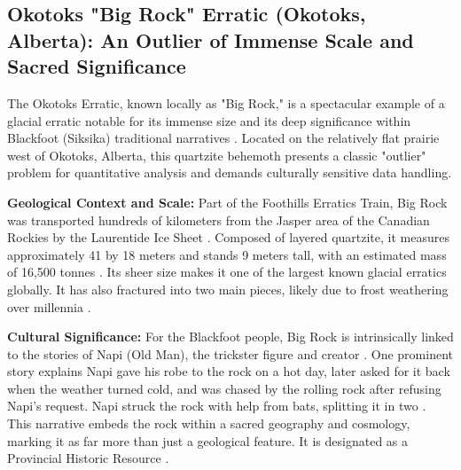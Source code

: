 \subsection{Okotoks "Big Rock" Erratic (Okotoks, Alberta): An Outlier of Immense Scale and Sacred Significance}
\label{subsec:okotoks}

The Okotoks Erratic, known locally as "Big Rock," is a spectacular example of a glacial erratic notable for its immense size and its deep significance within Blackfoot (Siksika) traditional narratives \cite{AlbertaOkotoks, Dempsey1997}. Located on the relatively flat prairie west of Okotoks, Alberta, this quartzite behemoth presents a classic "outlier" problem for quantitative analysis and demands culturally sensitive data handling.

\textbf{Geological Context and Scale:} Part of the Foothills Erratics Train, Big Rock was transported hundreds of kilometers from the Jasper area of the Canadian Rockies by the Laurentide Ice Sheet \cite{AlbertaOkotoks, Stalker1973}. Composed of layered quartzite, it measures approximately 41 by 18 meters and stands 9 meters tall, with an estimated mass of 16,500 tonnes \cite{AlbertaOkotoks}. Its sheer size makes it one of the largest known glacial erratics globally. It has also fractured into two main pieces, likely due to frost weathering over millennia \cite{Dempsey1997}.

\textbf{Cultural Significance:} For the Blackfoot people, Big Rock is intrinsically linked to the stories of Napi (Old Man), the trickster figure and creator \cite{Dempsey1997, Klassen1995}. One prominent story explains Napi gave his robe to the rock on a hot day, later asked for it back when the weather turned cold, and was chased by the rolling rock after refusing Napi's request. Napi struck the rock with help from bats, splitting it in two \cite{Dempsey1997}. This narrative embeds the rock within a sacred geography and cosmology, marking it as far more than just a geological feature. It is designated as a Provincial Historic Resource \cite{AlbertaOkotoks}.

